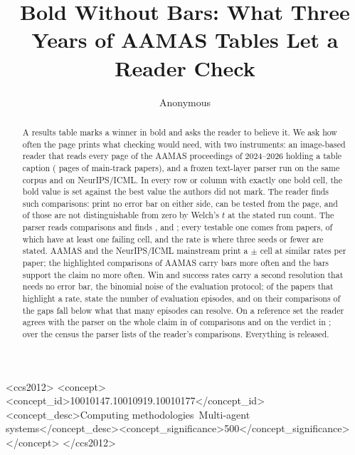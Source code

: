\documentclass[sigconf,anonymous]{aamas}
\title{Bold Without Bars: What Three Years of AAMAS Tables Let a Reader Check}
\author{Anonymous}
\affiliation{\institution{Anonymous}\city{}\country{}}
\begin{document}
\begin{abstract}
A results table marks a winner in bold and asks the reader to believe it. We
ask how often the page prints what checking would need, with two
instruments: an image-based reader that reads every page of the AAMAS
proceedings of 2024--2026 holding a table caption (\nCzPagesRead{} pages of
\nAPapers{} main-track papers), and a frozen text-layer parser run on the
same corpus and on NeurIPS/ICML. In every row or column with exactly one
bold cell, the bold value is set against the best value the authors did not
mark. The reader finds \nCzGroups{} such comparisons: \nCzNeitherCi{} print
no error bar on either side, \nCzTestableCi{} can be tested from the page,
and of those \nCzReaderFail{} are not distinguishable from zero by Welch's
$t$ at the stated run count. The parser reads \nAComparisons{} comparisons
and finds \nAPctNeither{}, \nAPctTestable{} and \nAPctFail{}; every
testable one comes from \nAPapersTestable{} papers, \nPpAnyFail{} of which
have at least one failing cell, and the rate is \nRunsLeThreeFail{} where
three seeds or fewer are stated. AAMAS and the NeurIPS/ICML mainstream print
a $\pm$ cell at similar rates per paper; the highlighted comparisons of
AAMAS carry bars more often and the bars support the claim no more often.
Win and success rates carry a second resolution that needs no error bar, the
binomial noise of the evaluation protocol; of the \nRatePapers{} papers that
highlight a rate, \nPrdReaderK{} state the number of evaluation episodes,
and on their comparisons \nPrdResBelow{} of the gaps fall below what that
many episodes can resolve. On a reference set the reader agrees with the
parser on the whole claim in \nGClaim{} of comparisons and on the verdict
in \nGVerdict{}; over the census the parser lists \nCzReaderFoundPct{} of
the reader's comparisons. Everything is released.
\end{abstract}

\begin{CCSXML}
<ccs2012>
<concept><concept_id>10010147.10010919.10010177</concept_id><concept_desc>Computing methodologies~Multi-agent systems</concept_desc><concept_significance>500</concept_significance></concept>
</ccs2012>
\end{CCSXML}

\maketitle
\end{document}
